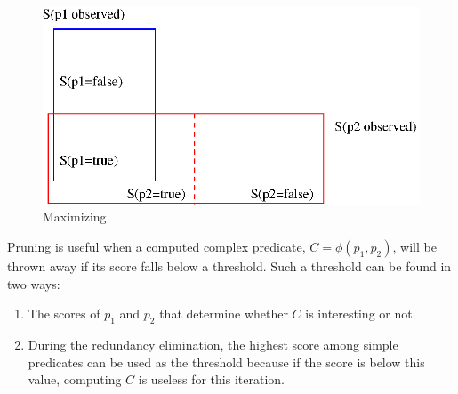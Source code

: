 \begin{figure}[h]
  \centering
  \includegraphics[scale = 0.6]{charts/maxsuccess}
  \caption{Maximizing }
  \label{maxsuccess}
\end{figure}


Pruning is useful when a computed complex predicate, $C = \phi(p_1, p_2)$, will be thrown away if its score falls below a threshold.  Such a threshold can be found in two ways:
\begin{enumerate}
\item The scores of $p_1$ and $p_2$ that determine whether $C$ is interesting or not.
\item During the redundancy elimination, the highest %
score among simple predicates can be used as the threshold because if the score is below this value, computing $C$ is useless for this iteration.
\end{enumerate}
